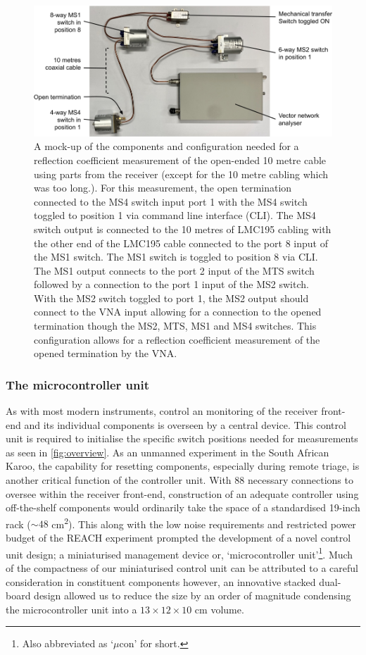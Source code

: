 \begin{figure}[t]
    \centering
    \includegraphics[width=\textwidth]{switch_example}
    \caption{A mock-up of the components and configuration needed for a reflection coefficient measurement of the open-ended 10 metre cable using parts from the receiver (except for the 10 metre cabling which was too long.). For this measurement, the open termination connected to the MS4 switch input port 1 with the MS4 switch toggled to position 1 via command line interface (CLI). The MS4 switch output is connected to the 10 metres of LMC195 cabling with the other end of the LMC195 cable connected to the port 8 input of the MS1 switch. The MS1 switch is toggled to position 8 via CLI. The MS1 output connects to the port 2 input of the MTS switch followed by a connection to the port 1 input of the MS2 switch. With the MS2 switch toggled to port 1, the MS2 output should connect to the VNA input allowing for a connection to the opened termination though the MS2, MTS, MS1 and MS4 switches. This configuration allows for a reflection coefficient measurement of the opened termination by the VNA.}
    \label{fig:switch_mock}
\end{figure}


\subsubsection{The microcontroller unit}
As with most modern instruments, control an monitoring of the receiver front-end and its individual components is overseen by a central device. This control unit is required to initialise the specific switch positions needed for measurements as seen in \cref{fig:overview}. As an unmanned experiment in the South African Karoo, the capability for resetting components, especially during remote triage, is another critical function of the controller unit. With 88 necessary connections to oversee within the receiver front-end, construction of an adequate controller using off-the-shelf components would ordinarily take the space of a standardised 19-inch rack ($\sim 48$ cm\textsuperscript{2}). This along with the low noise requirements and restricted power budget of the REACH experiment prompted the development of a novel control unit design; a miniaturised management device or, ‘microcontroller unit’\footnote{Also abbreviated as ‘$\mu$con’ for short.}. Much of the compactness of our miniaturised control unit can be attributed to a careful consideration in constituent components however, an innovative stacked dual-board design allowed us to reduce the size by an order of magnitude condensing the microcontroller unit into a $13 \times 12 \times 10$ cm volume.

